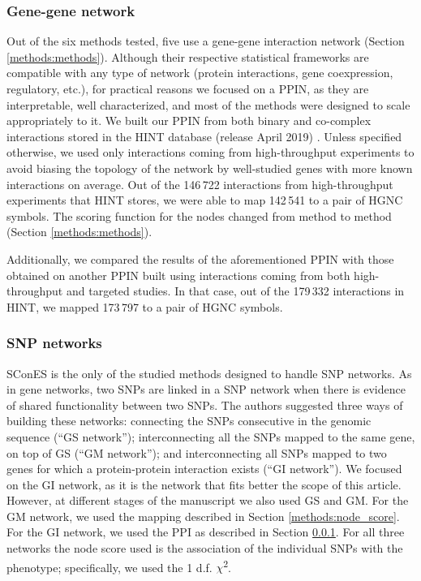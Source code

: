 \documentclass[twocolumn, 10pt]{article}
\begin{document}
\subsubsection{Gene-gene network}
\label{methods:gene_network}
Out of the six methods tested, five use a gene-gene interaction network (Section \ref{methods:methods}). Although their respective statistical frameworks are compatible with any type of network (protein interactions, gene coexpression, regulatory, etc.), for practical reasons we focused on a PPIN, as they are interpretable, well characterized, and most of the methods were designed to scale appropriately to it. We built our PPIN from both binary and co-complex interactions stored in the HINT database (release April 2019) \cite{das_hint:_2012}. Unless specified otherwise, we used only interactions coming from high-throughput experiments to avoid biasing the topology of the network by well-studied genes with more known interactions on average. Out of the 146\,722 interactions from high-throughput experiments that HINT stores, we were able to map 142\,541 to a pair of HGNC symbols. The scoring function for the nodes changed from method to method (Section \ref{methods:methods}).

Additionally, we compared the results of the aforementioned PPIN with those obtained on another PPIN built using interactions coming from both high-throughput and targeted studies. In that case, out of the 179\,332 interactions in HINT, we mapped 173\,797 to a pair of HGNC symbols. 

\subsubsection{SNP networks}
\label{methods:snp_network}
SConES \cite{azencott_efficient_2013} is the only of the studied methods designed to handle SNP networks. As in gene networks, two SNPs are linked in a SNP network when there is evidence of shared functionality between two SNPs. The authors suggested three ways of building these networks: connecting the SNPs consecutive in the genomic sequence (``GS network''); interconnecting all the SNPs mapped to the same gene, on top of GS (``GM network''); and interconnecting all SNPs mapped to two genes for which a protein-protein interaction exists (``GI network''). We focused on the GI network, as it is the network that fits better the scope of this article. However, at different stages of the manuscript we also used GS and GM. For the GM network, we used the mapping described in Section \ref{methods:node_score}. For the GI network, we used the PPI as described in Section \ref{methods:gene_network}. For all three networks the node score used is the association of the individual SNPs with the phenotype; specifically, we used the 1 d.f. \(\chi\)\textsuperscript{2}.
\end{document}
